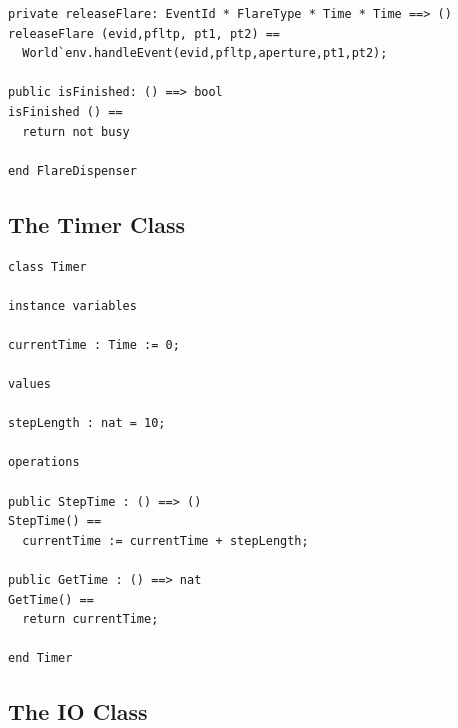 \documentclass{overturerepchap}
\begin{document}
\begin{lstlisting}
private releaseFlare: EventId * FlareType * Time * Time ==> ()
releaseFlare (evid,pfltp, pt1, pt2) == 
  World`env.handleEvent(evid,pfltp,aperture,pt1,pt2);

public isFinished: () ==> bool
isFinished () == 
  return not busy

end FlareDispenser
\end{lstlisting}

\subsection{The Timer Class}\label{sec:timerapp}

\begin{lstlisting}
class Timer

instance variables

currentTime : Time := 0;

values

stepLength : nat = 10;

operations

public StepTime : () ==> ()
StepTime() ==
  currentTime := currentTime + stepLength;

public GetTime : () ==> nat
GetTime() ==
  return currentTime;

end Timer
\end{lstlisting}

\subsection{The IO Class}
\end{document}
